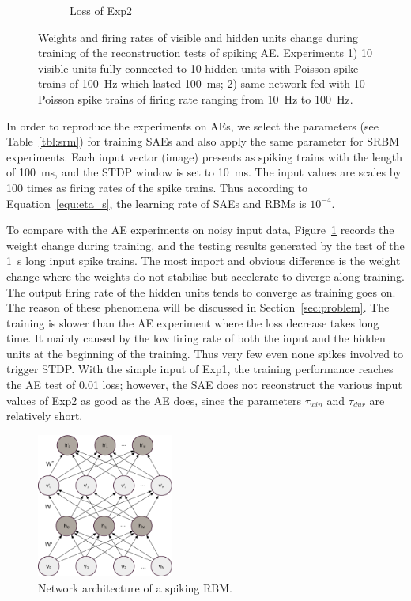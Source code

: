 \begin{figure}
\begin{subfigure}[t]{0.45\textwidth}
		\caption{Loss of Exp2}
	\end{subfigure}
	\caption{Weights and firing rates of visible and hidden units change during training of the reconstruction tests of spiking AE. 
		Experiments 1) 10 visible units fully connected to 10 hidden units with Poisson spike trains of 100~Hz which lasted 100~ms; 2) same network fed with 10 Poisson spike trains of firing rate ranging from 10~Hz to 100~Hz.}
	\label{fig:SAE_orig}
\end{figure}
In order to reproduce the experiments on AEs, we select the parameters (see Table~\ref{tbl:srm}) for training SAEs and also apply the same parameter for SRBM experiments.
Each input vector (image) presents as spiking trains with the length of 100~ms, and the STDP window is set to 10~ms.
The input values are scales by 100 times as firing rates of the spike trains.
Thus according to Equation~\ref{equ:eta_s}, the learning rate of SAEs and RBMs is $10^{-4}$.

To compare with the AE experiments on noisy input data, Figure~\ref{fig:SAE_orig} records the weight change during training, and the testing results generated by the test of the 1~s long input spike trains.
The most import and obvious difference is the weight change where the weights do not stabilise but accelerate to diverge along training.
The output firing rate of the hidden units tends to converge as training goes on.
The reason of these phenomena will be discussed in Section~\ref{sec:problem}.
The training is slower than the AE experiment where the loss decrease takes long time.
It mainly caused by the low firing rate of both the input and the hidden units at the beginning of the training.
Thus very few even none spikes involved to trigger STDP.
With the simple input of Exp1, the training performance reaches the AE test of 0.01 loss;
however, the SAE does not reconstruct the various input values of Exp2 as good as the AE does, since the parameters $\tau_{win}$ and $\tau_{dur}$ are relatively short.

\begin{figure}
	\centering
	\includegraphics[width=0.4\textwidth]{pics_sdlm/rbm.pdf}
	\caption{Network architecture of a spiking RBM.}
	\label{fig:sRBM}
\end{figure}

